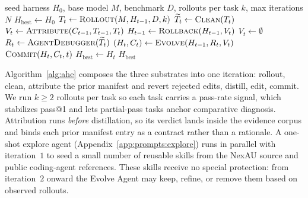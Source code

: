 \begin{algorithm}[htbp]
\caption{AHE outer loop.}
\label{alg:ahe}
\begin{algorithmic}[1]
\Require seed harness $H_0$, base model $M$, benchmark $D$, rollouts per task $k$, max iterations $N$
\State $H_{\text{best}} \gets H_0$
    \State $T_t \gets \textsc{Rollout}(M, H_{t-1}, D, k)$ 
    \State $\widetilde{T}_t \gets \textsc{Clean}(T_t)$ 
     
        \State $V_t \gets \textsc{Attribute}(C_{t-1}, T_{t-1}, T_t)$
        \State $H_{t-1} \gets \textsc{Rollback}(H_{t-1}, V_t)$
    \Else
        \State $V_t \gets \emptyset$
    \EndIf
    \State $R_t \gets \textsc{AgentDebugger}(\widetilde{T}_t)$ 
    \State $(H_t, C_t) \gets \textsc{Evolve}(H_{t-1}, R_t, V_t)$ 
    \State $\textsc{Commit}(H_t, C_t, t)$ 
     $H_{\text{best}} \gets H_t$ \EndIf
\EndFor
\State \Return $H_{\text{best}}$
\end{algorithmic}
\end{algorithm}

Algorithm~\ref{alg:ahe} composes the three substrates into one iteration: rollout, clean, attribute the prior manifest and revert rejected edits, distill, edit, commit.
We run $k\geq 2$ rollouts per task so each task carries a pass-rate signal, which stabilizes pass@1 and lets partial-pass tasks anchor comparative diagnosis.
Attribution runs \emph{before} distillation, so its verdict lands inside the evidence corpus and binds each prior manifest entry as a contract rather than a rationale.
A one-shot explore agent (Appendix~\ref{app:prompts:explore}) runs in parallel with iteration~$1$ to seed a small number of reusable skills from the NexAU source and public coding-agent references.
These skills receive no special protection: from iteration~$2$ onward the Evolve Agent may keep, refine, or remove them based on observed rollouts.